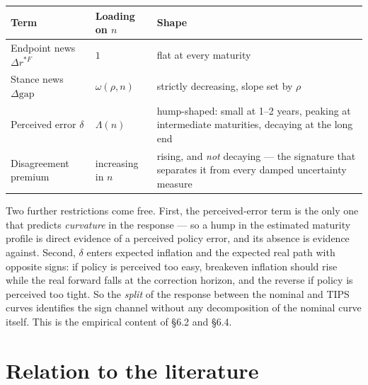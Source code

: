 \documentclass[11pt]{article}
\begin{document}
\begin{center}\small
\begin{tabular}{@{}llp{}@{}}
\toprule
\textbf{Term} & \textbf{Loading on $n$} & \textbf{Shape}\\ \midrule
Endpoint news $\Delta r^{*F}$ & $1$ & flat at every maturity\\
Stance news $\Delta\text{gap}$ & $\omega(\rho,n)$ & strictly decreasing, slope set by $\rho$\\
Perceived error $\delta$ & $\Lambda(n)$ & hump-shaped: small at 1--2 years, peaking at intermediate maturities, decaying at the long end\\
Disagreement premium & increasing in $n$ & rising, and \emph{not} decaying --- the signature that separates it from every damped uncertainty measure\\
\bottomrule\end{tabular}
\end{center}

\noindent Two further restrictions come free. First, the perceived-error term is the only one
that predicts \emph{curvature} in the response --- so a hump in the estimated maturity profile
is direct evidence of a perceived policy error, and its absence is evidence against. Second,
$\delta$ enters expected inflation and the expected real path with opposite signs: if policy
is perceived too easy, breakeven inflation should rise while the real forward falls at the
correction horizon, and the reverse if policy is perceived too tight. So the \emph{split} of
the response between the nominal and TIPS curves identifies the sign channel without any
decomposition of the nominal curve itself. This is the empirical content of \S6.2 and \S6.4.

\section{Relation to the literature}
\end{document}

